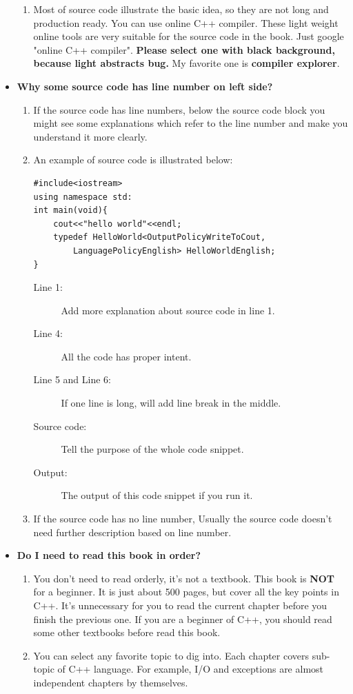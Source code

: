 \documentclass[a4paper,11pt,twoside]{book}
\begin{document}
\begin{itemize}
\begin{enumerate}
		\item Most of source code illustrate the basic idea, so they are not long and production ready. You can use online C++ compiler. These light weight online tools are very suitable for the source code in the book. Just google "online C++ compiler". \textbf{Please select one with black background, because light abstracts bug.} My favorite one is \textbf{compiler explorer}. 
	\end{enumerate}
	\item \textbf{Why some source code has line number on left side?}
	\begin{enumerate}
		\item If the source code has line numbers, below the source code block you might see some explanations which refer to the line number and make you understand it more clearly.

		\item An example of source code is illustrated below: 
		
\begin{lstlisting}
#include<iostream>
using namespace std:
int main(void){
	cout<<"hello world"<<endl;
	typedef HelloWorld<OutputPolicyWriteToCout, 
		LanguagePolicyEnglish> HelloWorldEnglish;
}
\end{lstlisting}

\begin{description}
	\item[Line 1:] Add more explanation about source code in line 1.
	\item[Line 4:] All the code has proper intent.
	\item[Line 5 and Line 6:] If one line is long, will add line break in the middle. 
	\item[Source code:] Tell the purpose of the whole code snippet.
	\item[Output:] The output of this code snippet if you run it.
\end{description}

		\item If the source code has no line number, Usually the source code doesn't need further description based on line number. 
	\end{enumerate}

	\item \textbf{Do I need to read this book in order?}
	\begin{enumerate}
        \item You don't need to read orderly, it's not a textbook. This book is \textbf{NOT} for a beginner. It is just about 500 pages, but cover all the key points in C++. It's unnecessary for you to read the current chapter before you finish the previous one. If you are a beginner of C++, you should read some other textbooks before read this book.

        \item You can select any favorite topic to dig into. Each chapter covers sub-topic of C++ language. For example, I/O and exceptions are almost independent chapters by themselves.
	\end{enumerate}

\end{itemize}
\end{document}
